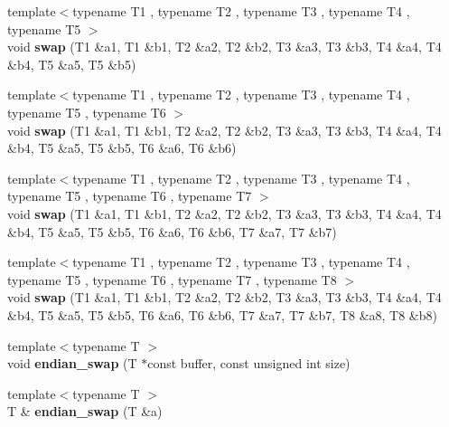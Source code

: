 \begin{DoxyCompactItemize}
\item 
\hypertarget{namespacecimg__library_1_1cimg_ad1d6d8928a14fc0dc489aef047adc5af}{{\footnotesize template$<$typename T1 , typename T2 , typename T3 , typename T4 , typename T5 $>$ }\\void {\bfseries swap} (T1 \&a1, T1 \&b1, T2 \&a2, T2 \&b2, T3 \&a3, T3 \&b3, T4 \&a4, T4 \&b4, T5 \&a5, T5 \&b5)}\label{namespacecimg__library_1_1cimg_ad1d6d8928a14fc0dc489aef047adc5af}

\item 
\hypertarget{namespacecimg__library_1_1cimg_a05a82f0bb81383dbce8cddccb1c959e3}{{\footnotesize template$<$typename T1 , typename T2 , typename T3 , typename T4 , typename T5 , typename T6 $>$ }\\void {\bfseries swap} (T1 \&a1, T1 \&b1, T2 \&a2, T2 \&b2, T3 \&a3, T3 \&b3, T4 \&a4, T4 \&b4, T5 \&a5, T5 \&b5, T6 \&a6, T6 \&b6)}\label{namespacecimg__library_1_1cimg_a05a82f0bb81383dbce8cddccb1c959e3}

\item 
\hypertarget{namespacecimg__library_1_1cimg_aeb2c61f17e4772c62b60e9ea12250264}{{\footnotesize template$<$typename T1 , typename T2 , typename T3 , typename T4 , typename T5 , typename T6 , typename T7 $>$ }\\void {\bfseries swap} (T1 \&a1, T1 \&b1, T2 \&a2, T2 \&b2, T3 \&a3, T3 \&b3, T4 \&a4, T4 \&b4, T5 \&a5, T5 \&b5, T6 \&a6, T6 \&b6, T7 \&a7, T7 \&b7)}\label{namespacecimg__library_1_1cimg_aeb2c61f17e4772c62b60e9ea12250264}

\item 
\hypertarget{namespacecimg__library_1_1cimg_a03d37d0ba72903c15b1cd3dc8f1d5c62}{{\footnotesize template$<$typename T1 , typename T2 , typename T3 , typename T4 , typename T5 , typename T6 , typename T7 , typename T8 $>$ }\\void {\bfseries swap} (T1 \&a1, T1 \&b1, T2 \&a2, T2 \&b2, T3 \&a3, T3 \&b3, T4 \&a4, T4 \&b4, T5 \&a5, T5 \&b5, T6 \&a6, T6 \&b6, T7 \&a7, T7 \&b7, T8 \&a8, T8 \&b8)}\label{namespacecimg__library_1_1cimg_a03d37d0ba72903c15b1cd3dc8f1d5c62}

\item 
\hypertarget{namespacecimg__library_1_1cimg_abfcb7c94ed4ab64ff1c2720aeb8250dc}{{\footnotesize template$<$typename T $>$ }\\void {\bfseries endian\-\_\-swap} (T $\ast$const buffer, const unsigned int size)}\label{namespacecimg__library_1_1cimg_abfcb7c94ed4ab64ff1c2720aeb8250dc}

\item 
\hypertarget{namespacecimg__library_1_1cimg_a53819e1c4e36063e9423f0f2cb6b6eea}{{\footnotesize template$<$typename T $>$ }\\T \& {\bfseries endian\-\_\-swap} (T \&a)}\label{namespacecimg__library_1_1cimg_a53819e1c4e36063e9423f0f2cb6b6eea}


\end{DoxyCompactItemize}
